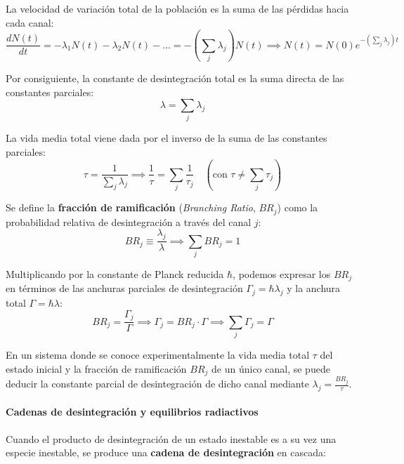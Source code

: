 La velocidad de variación total de la población es la suma de las pérdidas hacia cada canal:
\begin{equation}
\frac{dN(t)}{dt} = -\lambda_1 N(t) - \lambda_2 N(t) - \dots = -\left(\sum_j \lambda_j\right) N(t) \implies N(t) = N(0) e^{-\left(\sum_j \lambda_j\right) t}
\end{equation}

Por consiguiente, la constante de desintegración total es la suma directa de las constantes parciales:
\begin{equation}
\lambda = \sum_j \lambda_j
\end{equation}

La vida media total viene dada por el inverso de la suma de las constantes parciales:
\begin{equation}
\tau = \frac{1}{\sum_j \lambda_j} \implies \frac{1}{\tau} = \sum_j \frac{1}{\tau_j} \quad \left(\text{con } \tau \neq \sum_j \tau_j\right)
\end{equation}

Se define la \textbf{fracción de ramificación} (\textit{Branching Ratio}, $BR_j$) como la probabilidad relativa de desintegración a través del canal $j$:
\begin{equation}
BR_j \equiv \frac{\lambda_j}{\lambda} \implies \sum_j BR_j = 1
\end{equation}

Multiplicando por la constante de Planck reducida $\hbar$, podemos expresar los $BR_j$ en términos de las anchuras parciales de desintegración $\Gamma_j = \hbar \lambda_j$ y la anchura total $\Gamma = \hbar \lambda$:
\begin{equation}
BR_j = \frac{\Gamma_j}{\Gamma} \implies \Gamma_j = BR_j \cdot \Gamma \implies \sum_j \Gamma_j = \Gamma
\end{equation}

\begin{observacion}
En un sistema donde se conoce experimentalmente la vida media total $\tau$ del estado inicial y la fracción de ramificación $BR_j$ de un único canal, se puede deducir la constante parcial de desintegración de dicho canal mediante $\lambda_j = \frac{BR_j}{\tau}$.
\end{observacion}

\paragraph{Cadenas de desintegración y equilibrios radiactivos}

Cuando el producto de desintegración de un estado inestable es a su vez una especie inestable, se produce una \textbf{cadena de desintegración} en cascada:

